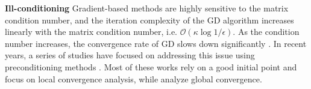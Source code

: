 
\textbf{Ill-conditioning}
Gradient-based methods are highly sensitive to the matrix condition number, and the iteration complexity of the GD algorithm increases linearly with the matrix condition number, i.e. $\mathcal{O}(\kappa \log1/\epsilon)$. As the condition number increases, the convergence rate of GD slows down significantly \cite{zheng2015convergent,zhang2023preconditioned}. In recent years, a series of studies have focused on addressing this issue using preconditioning methods \cite{mishra2012riemannian,wei2016guarantees,mishra2016riemannian,tanner2016low,tong2021accelerating,zhang2021preconditioned,zhang2023preconditioned,zhang2022accelerating,bian2023preconditioned,jia2024globally,jia2024preconditioning}. Most of these works rely on a good initial point and focus on local convergence analysis, while \cite{xu2023power,jia2024globally} analyze global convergence.


